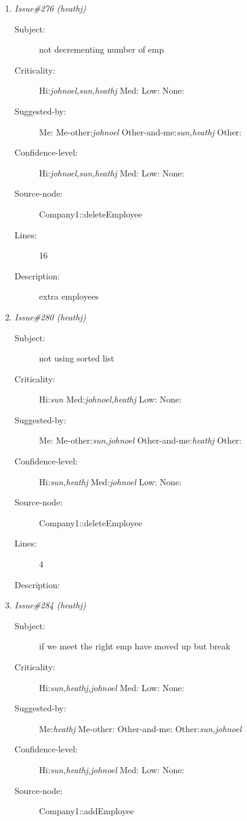 \begin{enumerate}
\begin{description}
\item [Lines:] 10-14

\item [Description:] two of the last name after delete.  The last
name on the list is not deleted so it will have two copies after the delete.
\end{description}
\item {\it Issue\#276 (heathj)}
\begin{description}
\item [Subject:] not decrementing number of emp
\item [Criticality:] Hi:{\it johnoel,sun,heathj} Med:{\it } Low:{\it } None:{\it }
\item [Suggested-by:] Me:{\it } Me-other:{\it johnoel} Other-and-me:{\it sun,heathj} Other:{\it }
\item [Confidence-level:] Hi:{\it johnoel,sun,heathj} Med:{\it } Low:{\it } None:{\it }
\item [Source-node:] Company1::deleteEmployee

\item [Lines:] 16

\item [Description:] extra employees
\end{description}
\item {\it Issue\#280 (heathj)}
\begin{description}
\item [Subject:] not using sorted list
\item [Criticality:] Hi:{\it sun} Med:{\it johnoel,heathj} Low:{\it } None:{\it }
\item [Suggested-by:] Me:{\it } Me-other:{\it sun,johnoel} Other-and-me:{\it heathj} Other:{\it }
\item [Confidence-level:] Hi:{\it sun,heathj} Med:{\it johnoel} Low:{\it } None:{\it }
\item [Source-node:] Company1::deleteEmployee

\item [Lines:] 4

\item [Description:] 
\end{description}
\item {\it Issue\#284 (heathj)}
\begin{description}
\item [Subject:] if we meet the right emp have moved up but break
\item [Criticality:] Hi:{\it sun,heathj,johnoel} Med:{\it } Low:{\it } None:{\it }
\item [Suggested-by:] Me:{\it heathj} Me-other:{\it } Other-and-me:{\it } Other:{\it sun,johnoel}
\item [Confidence-level:] Hi:{\it sun,heathj,johnoel} Med:{\it } Low:{\it } None:{\it }
\item [Source-node:] Company1::addEmployee


\end{description}
\end{enumerate}
